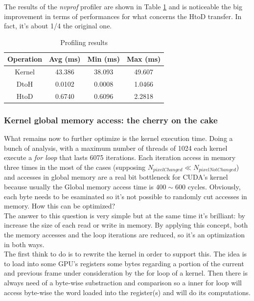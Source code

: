 \documentclass[paper=a4, fontsize=10pt]{scrartcl}	%
\begin{document}
	The results of the \textit{nvprof} profiler are shown in Table \ref{tab:nvprof_naif3} and is noticeable the big improvement in terms of performances for what concerns the HtoD transfer. In fact, it's about 1/4 the original one.

	\begin{table}[H]
		\centering
		\begin{tabular}{||c | c c c||} 
			\hline
			Operation & Avg (ms) & Min (ms) & Max (ms) \\ [0.5ex] 
			\hline\hline
			Kernel & 43.386 & 38.093 & 49.607 \\ 
			\hdashline
			DtoH & 0.0102 & 0.0008 & 1.0466 \\
			\hdashline
			HtoD & 0.6740 & 0.6096 & 2.2818 \\
			\hline
		\end{tabular}
		\caption{Profiling results}
		\label{tab:nvprof_naif3}
	\end{table}

	\subsubsection{Kernel global memory access: the cherry on the cake}

	What remains now to further optimize is the kernel execution time. Doing a bunch of analysis, with a maximum number of threads of 1024 each kernel execute a \textit{for loop} that lasts 6075 iterations. Each iteration access in memory three times in the most of the cases (supposing $ N_{pixelChanged} \ll N_{pixelNotChanged} $) and accesses in global memory are a real bit bottleneck for CUDA's kernel because usually the Global memory access time is $400 \sim 600$ cycles. Obviously, each byte needs to be esaminated so it's not possible to randomly cut accesses in memory. How this can be optimized?\\

	The answer to this question is very simple but at the same time it's brilliant: by increase the size of each read or write in memory. By applying this concept, both the memory accesses and the loop iterations are reduced, so it's an optimization in both ways.\\

	The first think to do is to rewrite the kernel in order to support this. The idea is to load into some GPU's registers some bytes regarding a portion of the current and previous frame under consideration by the for loop of a kernel. Then there is always need of a byte-wise substraction and comparison so a inner for loop will access byte-wise the word loaded into the register(s) and will do its computations.\\
\end{document}
